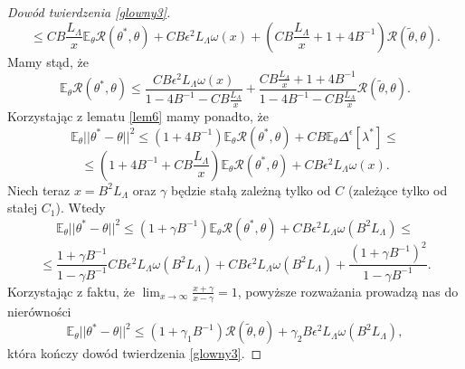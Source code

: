 \documentclass{article}
\begin{document}
\begin{proof}[Dowód twierdzenia \ref{glowny3}]
\begin{displaymath}
\end{displaymath}
\begin{displaymath}
\leq CB\frac{L_{\Lambda}}{x}\mathbb{E}_{\theta}\mathcal{R}(\theta^*,\theta)+CB\epsilon^2L_{\Lambda}\omega (x)+\left(CB\frac{L_{\Lambda}}{x}+1+4B^{-1}\right)\mathcal{R}(\tilde{\theta},\theta).
\end{displaymath}
Mamy stąd, że 
\begin{displaymath}
\mathbb{E}_{\theta}\mathcal{R}(\theta^*,\theta)\leq \frac{CB\epsilon^2L_{\Lambda}\omega (x)}{1-4B^{-1}-CB\frac{L_{\Lambda}}{x}}+\frac{CB\frac{L_{\Lambda}}{x}+1+4B^{-1}}{1-4B^{-1}-CB\frac{L_{\Lambda}}{x}}\mathcal{R}(\tilde{\theta},\theta).
\end{displaymath}
Korzystając z lematu \ref{lem6} mamy ponadto, że
\begin{displaymath}
\mathbb{E}_{\theta}||\theta^*-\theta||^2\leq (1+4B^{-1})\mathbb{E}_{\theta}\mathcal{R}(\theta^*,\theta)+CB\mathbb{E}_{\theta}\Delta^{\epsilon}[\lambda^*]\leq
\end{displaymath}
\begin{displaymath}
\leq (1+4B^{-1}+CB\frac{L_{\Lambda}}{x})\mathbb{E}_{\theta}\mathcal{R}(\theta^*,\theta)+CB\epsilon^2L_{\Lambda}\omega (x).
\end{displaymath}
Niech teraz $x=B^2L_{\Lambda}$ oraz $\gamma$ będzie stałą zależną tylko od $C$ (zależące tylko od stałej $C_1$). Wtedy 
\begin{displaymath}
\mathbb{E}_{\theta}||\theta^*-\theta||^2\leq (1+\gamma B^{-1})\mathbb{E}_{\theta}\mathcal{R}(\theta^*,\theta)+CB\epsilon^2L_{\Lambda}\omega (B^2L_{\Lambda})\leq
\end{displaymath}
\begin{displaymath}
\leq \frac{1+\gamma B^{-1}}{1-\gamma B^{-1}}CB\epsilon^2L_{\Lambda}\omega (B^2L_{\Lambda})+CB\epsilon^2L_{\Lambda}\omega (B^2L_{\Lambda})+\frac{(1+\gamma B^{-1})^2}{1-\gamma B^{-1}}.
\end{displaymath}
Korzystając z faktu, że $\lim_{x\to \infty}\frac{x+\gamma}{x-\gamma}=1$, powyższe rozważania prowadzą nas do nierówności  
\begin{displaymath}
\mathbb{E}_{\theta}||\theta^*-\theta||^2\leq (1+\gamma_1B^{-1})\mathcal{R}(\tilde{\theta},\theta)+\gamma_2B\epsilon^2L_{\Lambda}\omega (B^2L_{\Lambda}),
\end{displaymath}
która kończy dowód twierdzenia \ref{glowny3}.
\end{proof}
\end{document}
